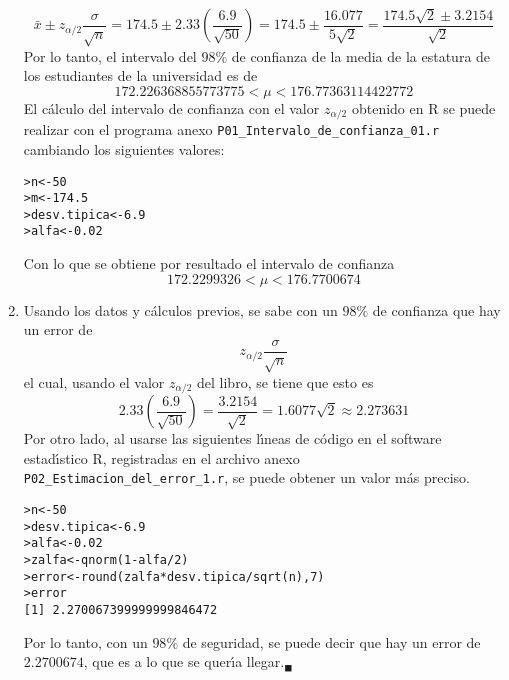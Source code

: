 \begin{solucion}
\begin{enumerate}
  \begin{equation*}
   \bar{x}\pm z_{\alpha/2}\frac{\sigma}{\sqrt{n}} = 174.5\pm2.33\left(\frac{6.9}{\sqrt{50}}\right) = 174.5\pm\frac{16.077}{5\sqrt{2}} = \frac{174.5\sqrt{2}\pm3.2154}{\sqrt{2}}
  \end{equation*}
  Por lo tanto, el intervalo del $98\%$ de confianza de la media de la estatura de los estudiantes de la universidad es de
  \begin{equation*}
   172.226368855773775 < \mu < 176.77363114422772
  \end{equation*}
  El c\'alculo del intervalo de confianza con el valor $z_{\alpha/2}$ obtenido en R se puede realizar con el programa anexo \texttt{P01\_Intervalo\_de\_confianza\_01.r} cambiando los siguientes valores:
  \begin{verbatim}
>n<-50
>m<-174.5
>desv.tipica<-6.9
>alfa<-0.02
  \end{verbatim}
  \vspace{-0.5cm}
  Con lo que se obtiene por resultado el intervalo de confianza
  \begin{equation*}
   172.2299326 < \mu < 176.7700674
  \end{equation*}
  
  \item Usando los datos y c\'alculos previos, se sabe con un $98\%$ de confianza que hay un error de
  \begin{equation*}
   z_{\alpha/2}\frac{\sigma}{\sqrt{n}}
  \end{equation*}
  el cual, usando el valor $z_{\alpha/2}$ del libro, se tiene que esto es
  \begin{equation*}
   2.33\left(\frac{6.9}{\sqrt{50}}\right) = \frac{3.2154}{\sqrt{2}} = 1.6077\sqrt{2} \approx 2.273631
  \end{equation*}
  Por otro lado, al usarse las siguientes l\'{\i}neas de c\'odigo en el software estad\'{\i}stico R, registradas en el archivo anexo \texttt{P02\_Estimacion\_del\_error\_1.r}, se puede obtener un valor m\'as preciso.
  \begin{verbatim}
>n<-50
>desv.tipica<-6.9
>alfa<-0.02
>zalfa<-qnorm(1-alfa/2)
>error<-round(zalfa*desv.tipica/sqrt(n),7)
>error
[1] 2.270067399999999846472
  \end{verbatim}
  \vspace{-0.5cm}
  Por lo tanto, con un $98\%$ de seguridad, se puede decir que hay un error de $2.2700674$, que es a lo que se quer\'{\i}a llegar.${}_{\blacksquare}$
 \end{enumerate}
\end{solucion}

